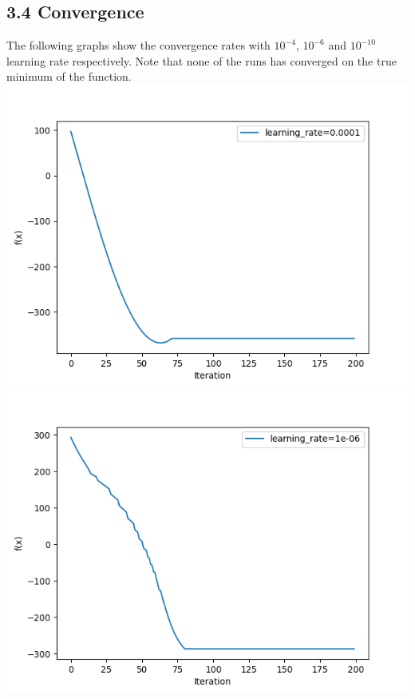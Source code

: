     \subsection*{3.4 Convergence}
    The following graphs show the convergence rates with $10^{-4}$, $10^{-6}$ and $10^{-10}$ learning rate respectively.
    Note that none of the runs has converged on the true minimum of the function.\\
    \includegraphics[width=\textwidth / 2]{3_fast_learn}
    \includegraphics[width=\textwidth / 2]{3_mid_learn}
